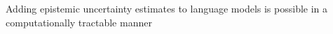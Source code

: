 \documentclass[preview]{standalone}
\begin{document}
Adding epistemic uncertainty estimates to language models is possible in a computationally tractable manner\\
\end{document}
